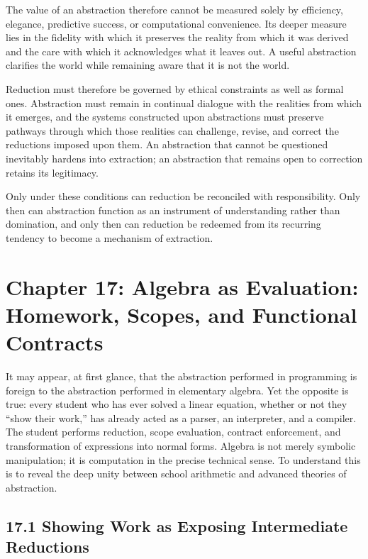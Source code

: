 \documentclass[12pt,letterpaper]{article}
\theoremstyle{remark}
\begin{document}
The value of an abstraction therefore cannot be measured solely by efficiency, elegance, predictive success, or computational convenience. Its deeper measure lies in the fidelity with which it preserves the reality from which it was derived and the care with which it acknowledges what it leaves out. A useful abstraction clarifies the world while remaining aware that it is not the world.

Reduction must therefore be governed by ethical constraints as well as formal ones. Abstraction must remain in continual dialogue with the realities from which it emerges, and the systems constructed upon abstractions must preserve pathways through which those realities can challenge, revise, and correct the reductions imposed upon them. An abstraction that cannot be questioned inevitably hardens into extraction; an abstraction that remains open to correction retains its legitimacy.

Only under these conditions can reduction be reconciled with responsibility. Only then can abstraction function as an instrument of understanding rather than domination, and only then can reduction be redeemed from its recurring tendency to become a mechanism of extraction.

\newpage
\section{Chapter 17: Algebra as Evaluation: Homework, Scopes, and Functional Contracts}

It may appear, at first glance, that the abstraction performed in programming is foreign to the abstraction performed in elementary algebra. Yet the opposite is true: every student who has ever solved a linear equation, whether or not they ``show their work,'' has already acted as a parser, an interpreter, and a compiler. The student performs reduction, scope evaluation, contract enforcement, and transformation of expressions into normal forms. Algebra is not merely symbolic manipulation; it is computation in the precise technical sense. To understand this is to reveal the deep unity between school arithmetic and advanced theories of abstraction.

\subsection{17.1 Showing Work as Exposing Intermediate Reductions}
\end{document}
